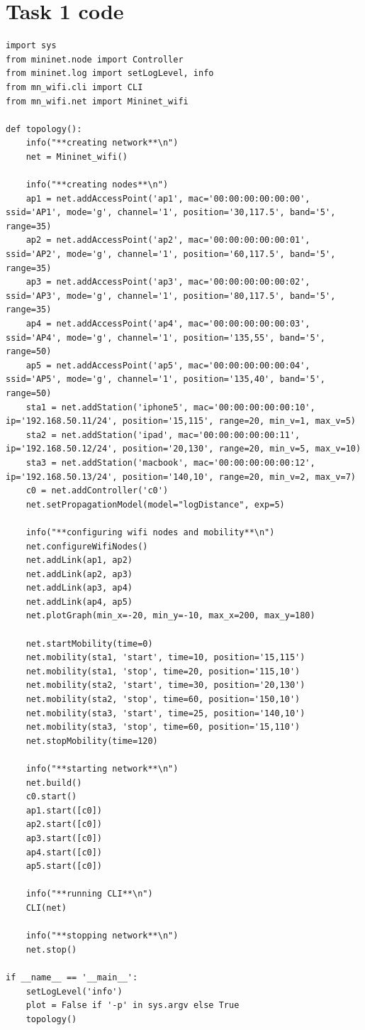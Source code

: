 \documentclass{article}
\begin{document}
\renewcommand{\thesection}{\alph{section}}
\setcounter{section}{0}
\section{Task 1 code}
\begin{lstlisting}
import sys
from mininet.node import Controller
from mininet.log import setLogLevel, info
from mn_wifi.cli import CLI
from mn_wifi.net import Mininet_wifi

def topology():
    info("**creating network**\n")
    net = Mininet_wifi()

    info("**creating nodes**\n")
    ap1 = net.addAccessPoint('ap1', mac='00:00:00:00:00:00', ssid='AP1', mode='g', channel='1', position='30,117.5', band='5', range=35)
    ap2 = net.addAccessPoint('ap2', mac='00:00:00:00:00:01', ssid='AP2', mode='g', channel='1', position='60,117.5', band='5', range=35)
    ap3 = net.addAccessPoint('ap3', mac='00:00:00:00:00:02', ssid='AP3', mode='g', channel='1', position='80,117.5', band='5', range=35)
    ap4 = net.addAccessPoint('ap4', mac='00:00:00:00:00:03', ssid='AP4', mode='g', channel='1', position='135,55', band='5', range=50)
    ap5 = net.addAccessPoint('ap5', mac='00:00:00:00:00:04', ssid='AP5', mode='g', channel='1', position='135,40', band='5', range=50)
    sta1 = net.addStation('iphone5', mac='00:00:00:00:00:10', ip='192.168.50.11/24', position='15,115', range=20, min_v=1, max_v=5)
    sta2 = net.addStation('ipad', mac='00:00:00:00:00:11', ip='192.168.50.12/24', position='20,130', range=20, min_v=5, max_v=10)
    sta3 = net.addStation('macbook', mac='00:00:00:00:00:12', ip='192.168.50.13/24', position='140,10', range=20, min_v=2, max_v=7)
    c0 = net.addController('c0')
    net.setPropagationModel(model="logDistance", exp=5)

    info("**configuring wifi nodes and mobility**\n")
    net.configureWifiNodes()
    net.addLink(ap1, ap2)
    net.addLink(ap2, ap3)
    net.addLink(ap3, ap4)
    net.addLink(ap4, ap5)
    net.plotGraph(min_x=-20, min_y=-10, max_x=200, max_y=180)

    net.startMobility(time=0)
    net.mobility(sta1, 'start', time=10, position='15,115')
    net.mobility(sta1, 'stop', time=20, position='115,10')
    net.mobility(sta2, 'start', time=30, position='20,130')
    net.mobility(sta2, 'stop', time=60, position='150,10')
    net.mobility(sta3, 'start', time=25, position='140,10')
    net.mobility(sta3, 'stop', time=60, position='15,110')
    net.stopMobility(time=120)

    info("**starting network**\n")
    net.build()
    c0.start()
    ap1.start([c0])
    ap2.start([c0])
    ap3.start([c0])
    ap4.start([c0])
    ap5.start([c0])

    info("**running CLI**\n")
    CLI(net)

    info("**stopping network**\n")
    net.stop()

if __name__ == '__main__':
    setLogLevel('info')
    plot = False if '-p' in sys.argv else True
    topology()
\end{lstlisting}
\end{document}
